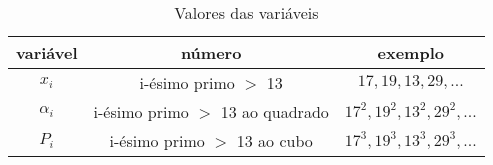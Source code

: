 \documentclass{article}
\begin{document}
\hspace{0pt} 

\begin{table}[!h]
    \centering
    \begin{tabular}{c|c|c}
        \textbf{variável} & \textbf{número} & \textbf{exemplo}\\
        \hline
        $x_i$ & i-ésimo primo $>$ 13 & $17, 19, 13, 29, ...$\\
        $\alpha_i$ & i-ésimo primo $>$ 13 ao quadrado & $17^2, 19^2, 13^2, 29^2, ...$\\
        $P_i$ & i-ésimo primo $>$ 13 ao cubo & $17^3, 19^3, 13^3, 29^3, ...$\\
    \end{tabular}
    \caption{Valores das variáveis}
\end{table}
\end{document}
